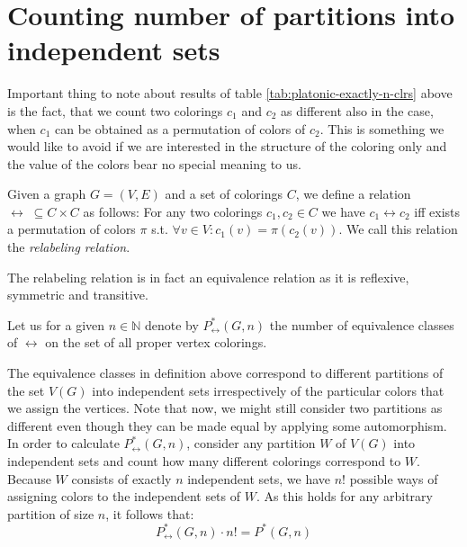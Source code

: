 \chapter{Counting number of partitions into independent sets}
\label{chap:num-partitions-into-indep-sets}

\begin{highlight}

Important thing to note about results of table \ref{tab:platonic-exactly-n-clrs} above is the fact, that we count two colorings $c_1$ and $c_2$ as different also in the case, when $c_1$ can be obtained as a permutation of colors of $c_2$. This is something we would like to avoid if we are interested in the structure of the coloring only and the value of the colors bear no special meaning to us. 

\begin{defn}
    Given a graph $G=(V,E)$ and a set of colorings $C$, we define a relation $\leftrightarrow \; \subseteq C \times C$ as follows: For any two colorings $c_1,c_2 \in C$ we have $c_1 \leftrightarrow c_2$ iff exists a permutation of colors $\pi$ s.t. $\forall v \in V : c_1(v) = \pi(c_2(v))$. We call this relation the \emph{relabeling relation}.
\end{defn}

The relabeling relation is in fact an equivalence relation as it is reflexive, symmetric and transitive.

\begin{defn}
    Let us for a given $n \in \mathbb{N}$ denote by $P^*_{\leftrightarrow}(G,n)$ the number of equivalence classes of $\leftrightarrow$ on the set of all proper vertex colorings. 
\end{defn}

The equivalence classes in definition above correspond to different partitions of the set $V(G)$ into independent sets irrespectively of the particular colors that we assign the vertices. Note that now, we might still consider two partitions as different even though they can be made equal by applying some automorphism. In order to calculate $P^*_{\leftrightarrow}(G,n)$, consider any partition $W$ of $V(G)$ into independent sets and count how many different colorings correspond to $W$. Because $W$ consists of exactly $n$ independent sets, we have $n!$ possible ways of assigning colors to the independent sets of $W$. As this holds for any arbitrary partition of size $n$, it follows that:
\begin{equation}\label{eqn:count-relabel-orbits}
    P^*_{\leftrightarrow}(G,n) \cdot n! = P^*(G,n)
\end{equation}


\end{highlight}
